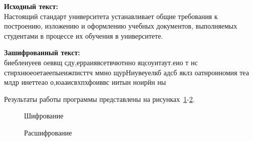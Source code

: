 \textbf{Исходный текст:} \\
    Настоящий стандарт университета устанавливает общие требования к построению,
    изложению и оформлению учебных документов, выполняемых студентами в процессе
    их обучения в университете.

\textbf{Зашифрованный текст:} \\
    биеблеиуеев  оеввщ сду,ерраиявсетвчютнно яцсоуитаут.еио т нс  стнрхнюеоетаеепыеижписттч 
    ммно щурНиувеуелкб адсб яклз оатнроиномия теа млдр инеттеао о,юааисвхпхфоиввс иитын ноирйн ны

Результаты работы программы представлены на рисунках~\ref{ris:encode-test-5}-\ref{ris:decode-test-5}.

\vspace{\baselineskip}
\begin{figure}[H]
    \caption{Шифрование}
\label{ris:encode-test-5}
\end{figure}

\vspace{\baselineskip}
\begin{figure}[H]
    \caption{Расшифрование}
\label{ris:decode-test-5}
\end{figure}

